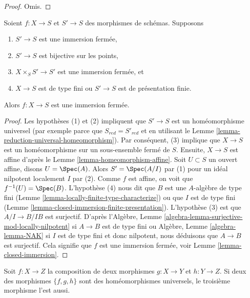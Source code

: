 \begin{proof}
Omis.
\end{proof}

\begin{lemma}
\label{lemma-check-closed-infinitesimally}
Soient $f : X \to S$ et $S' \to S$ des morphismes de schémas.
Supposons
\begin{enumerate}
\item $S' \to S$ est une immersion fermée,
\item $S' \to S$ est bijective sur les points,
\item $X \times_S S' \to S'$ est une immersion fermée, et
\item $X \to S$ est de type fini ou $S' \to S$ est de présentation finie.
\end{enumerate}
Alors $f : X \to S$ est une immersion fermée.
\end{lemma}

\begin{proof}
Les hypothèses (1) et (2) impliquent que $S' \to S$ est un homéomorphisme universel
(par exemple parce que $S_{red} = S'_{red}$ et en utilisant
le Lemme \ref{lemma-reduction-universal-homeomorphism}). Par conséquent, (3) implique
que $X \to S$ est un homéomorphisme sur un sous-ensemble
fermé de $S$. Ensuite, $X \to S$
est affine d'après le Lemme \ref{lemma-homeomorphism-affine}.
Soit $U \subset S$ un ouvert affine, disons $U = \Spec(A)$. Alors $S' = \Spec(A/I)$ par (1) pour
un idéal nilpotent localement $I$ par (2). Comme $f$ est affine,
on voit que $f^{-1}(U) = \Spec(B)$.
L'hypothèse (4) nous dit que $B$ est une $A$-algèbre
de type fini (Lemme \ref{lemma-locally-finite-type-characterize}) ou que
$I$ est de type fini
(Lemme \ref{lemma-closed-immersion-finite-presentation}). L'hypothèse (3) est que $A/I \to B/IB$
est surjectif. D'après l'Algèbre, Lemme
\ref{algebra-lemma-surjective-mod-locally-nilpotent} si $A \to B$ est de type fini ou Algèbre,
Lemme \ref{algebra-lemma-NAK} si $I$
est de type fini et donc nilpotent, nous déduisons
que $A \to B$ est surjectif. Cela signifie
que $f$ est une immersion fermée,
voir Lemme \ref{lemma-closed-immersion}.
\end{proof}

\begin{lemma}
\label{lemma-permanence-universal-homeomorphism}
Soit $f : X \to Z$ la composition de deux morphismes $g : X \to Y$
et $h : Y \to Z$. Si deux des
morphismes $\{f, g, h\}$ sont des homéomorphismes universels, le troisième
morphisme l'est aussi.
\end{lemma}

